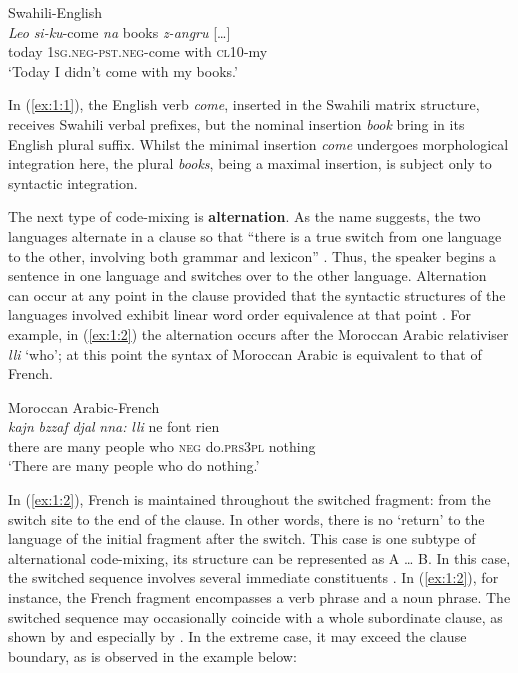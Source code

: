\ea{\label{ex:1:1}} 
Swahili-English \citep[][80]{myers-scotton-duelling-1993}\\
\gll \textit{Leo} \textit{si-ku}-come \textit{na} books \textit{z-angru} {[\dots]}\\
	today \textsc{1sg.neg-pst.neg}-come with {} \textsc{cl10}-my\\
\glt `Today I didn't come with my books.' 
\z

\noindent In (\ref{ex:1:1}), the English verb \textit{come}, inserted in the Swahili matrix structure, receives Swahili verbal prefixes, but the nominal insertion \textit{book} bring in its English plural suffix. Whilst the minimal insertion \textit{come} undergoes morphological integration here, the plural \textit{books}, being a maximal insertion, is subject only to syntactic integration.

The next type of code-mixing is \textbf{alternation}. As the name suggests, the two languages alternate in a clause so that ``there is a true switch from one language to the other, involving both grammar and lexicon'' \citep[5]{muysken-bilingual-2000}. Thus, the speaker begins a sentence in one language and switches over to the other language. Alternation can occur at any point in the clause provided that the syntactic structures of the languages involved exhibit linear word order equivalence at that point \citep[cf.][114]{muysken-bilingual-2000}. For example, in (\ref{ex:1:2}) the alternation occurs after the Moroccan Arabic relativiser \textit{lli} `who'; at this point the syntax of Moroccan Arabic is equivalent to that of French.

\ea
\label{ex:1:2}
Moroccan Arabic-French \citep[311]{bentahila-davies-1983}\\
\gll \textit{kajn} \textit{bzzaf} \textit{djal} \textit{nna:} \textit{lli} ne font rien\\
	there are many people who \textsc{neg} do.\textsc{prs3pl} nothing\\
\glt `There are many people who do nothing.'
\z

\noindent In (\ref{ex:1:2}), French is maintained throughout the switched fragment: from the switch site to the end of the clause. In other words, there is no `return' to the language of the initial fragment after the switch. This case is one subtype of alternational code-mixing, its structure can be represented as A \dots{} B. In this case, the switched sequence involves several immediate constituents \citep[cf.][96]{muysken-bilingual-2000}. In (\ref{ex:1:2}), for instance, the French fragment encompasses a verb phrase and a noun phrase. The switched sequence may occasionally coincide with a whole subordinate clause, as shown by \citet[312]{pfaff-1979} and especially by \citet[196--200]{treffers-daller-mixing-1994}. In the extreme case, it may exceed the clause boundary, as is observed in the example below:

